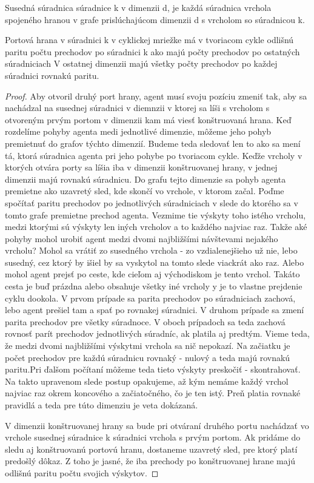 \begin{ozn}
Susedná súradnica súradnice k v dimenzii d, je každá súradnica vrchola
spojeného hranou v grafe prislúchajúcom dimenzii d s vrcholom so súradnicou
k.
\end{ozn}



\begin{lem}
Portová hrana v súradnici k v cyklickej mriežke má v tvoriacom cykle 
odlišnú paritu počtu prechodov po súradnici k ako majú počty prechodov 
po ostatných súradniciach
V ostatnej dimenzii majú všetky počty prechodov po každej súradnici 
rovnakú paritu.
\end{lem}
\begin{proof}
Aby otvoril druhý port hrany, agent musí svoju pozíciu zmeniť tak, 
aby sa nachádzal na susednej súradnici v diemnzii v ktorej sa líši s
vrcholom s otvoreným prvým portom v dimenzii kam má viesť konštruovaná hrana.
Keď rozdelíme pohyby agenta medi jednotlivé dimenzie, môžeme jeho pohyb
premietnuť do grafov týchto dimenzií. Budeme teda sledovať len to ako sa
mení tá, ktorá súradnica agenta pri jeho pohybe po tvoriacom cykle.
Keďže vrcholy v ktorých otvára porty sa líšia iba v dimenzii konštruovanej
hrany, v jednej dimenzii majú rovnakú súradnicu. Do grafu tejto dimenzie sa
pohyb agenta premietne ako uzavretý sled, kde skončí vo vrchole, v ktorom
začal.
Poďme spočítať paritu prechodov po jednotlivých súradniciach v slede do
ktorého sa v tomto grafe premietne prechod agenta.  Vezmime tie výskyty toho
istého vrcholu, medzi ktorými sú výskyty len iných vrcholov a to každého 
najviac raz. Takže aké pohyby mohol urobiť agent medzi dvomi najbližšími
návštevami nejakého vrcholu? Mohol sa vrátiť zo susedného vrchola - zo
vzdialenejšieho už nie, lebo susedný, cez ktorý by išiel by sa vyskytol na
tomto slede viackrát ako raz. 
Alebo mohol agent prejsť po ceste, kde cieľom
aj východiskom je tento vrchol. Takáto cesta je buď prázdna alebo obsahuje
všetky iné vrcholy y je to vlastne prejdenie cyklu dookola.
V prvom prípade sa parita prechodov po súradniciach zachová, lebo agent
prešiel tam a spať po rovnakej súradnici. V druhom prípade sa zmení parita
prechodov pre všetky súradnoce. V oboch prípadoch sa teda zachová rovnosť
parít prechodov jednotlivých súradníc, ak platila aj predtým. 
Vieme teda, že medzi dvomi najbližšími výskytmi vrchola sa nič nepokazí. Na
začiatku je počet prechodov pre každú súradnicu rovnaký - nulový a teda majú
rovnakú paritu.Pri ďalšom počítaní môžeme teda tieto výskyty preskočiť -
skontrahovať. Na takto upravenom slede postup opakujeme, až kým nemáme každý
vrchol najviac raz okrem koncového a začiatočného, čo je ten istý. Preň
platia rovnaké pravidlá a teda pre túto dimenziu je veta dokázaná.


V dimenzii konštruovanej hrany sa bude pri otváraní druhého portu nachádzať
vo vrchole susednej súradnice k súradnici vrchola s prvým portom.
Ak pridáme do sledu aj konštruovanú portovú hranu, dostaneme uzavretý sled, pre ktorý
platí predošlý dôkaz. Z toho je jasné, že iba prechody po konštruovanej
hrane majú odlišnú paritu počtu svojich výskytov.
\end{proof}



